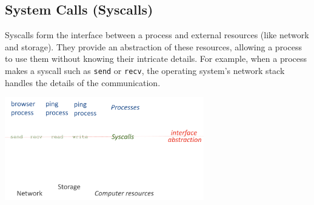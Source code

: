 \documentclass[../../compsys.tex]{subfiles}
\begin{document}
\subsection{System Calls (Syscalls)}

Syscalls form the interface between a process and external resources (like network and storage). They provide an abstraction of these resources, allowing a process to use them without knowing their intricate details. For example, when a process makes a syscall such as \texttt{send} or \texttt{recv}, the operating system’s network stack handles the details of the communication.

\begin{center}
  \includegraphics[width=0.65\textwidth]{chapters/L1/images/syscalls.png}
\end{center}
\vfill
\newpage
\end{document}

